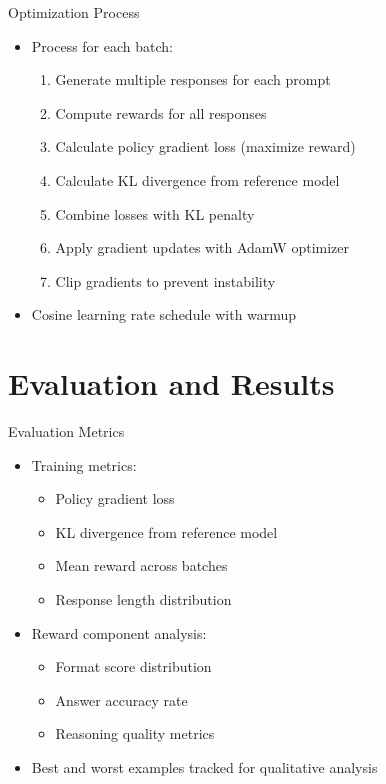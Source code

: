 \documentclass{beamer}
\begin{document}
\begin{frame}{Optimization Process}
  \begin{itemize}
    \item Process for each batch:
    \begin{enumerate}
      \item Generate multiple responses for each prompt
      \item Compute rewards for all responses
      \item Calculate policy gradient loss (maximize reward)
      \item Calculate KL divergence from reference model
      \item Combine losses with KL penalty
      \item Apply gradient updates with AdamW optimizer
      \item Clip gradients to prevent instability
    \end{enumerate}
    \item Cosine learning rate schedule with warmup
  \end{itemize}
\end{frame}

\section{Evaluation and Results}

\begin{frame}{Evaluation Metrics}
  \begin{itemize}
    \item Training metrics:
    \begin{itemize}
      \item Policy gradient loss
      \item KL divergence from reference model
      \item Mean reward across batches
      \item Response length distribution
    \end{itemize}
    \item Reward component analysis:
    \begin{itemize}
      \item Format score distribution
      \item Answer accuracy rate
      \item Reasoning quality metrics
    \end{itemize}
    \item Best and worst examples tracked for qualitative analysis
  \end{itemize}
\end{frame}
\end{document}
